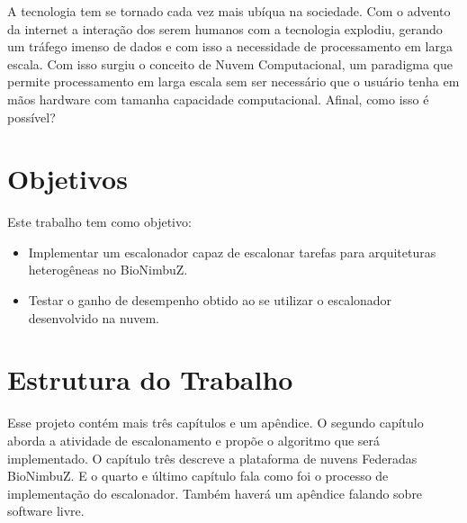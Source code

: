 A tecnologia tem se tornado cada vez mais ubíqua na sociedade. Com o advento da internet a interação dos serem humanos com a tecnologia explodiu, gerando um tráfego imenso de dados e com isso a necessidade de processamento em larga escala. Com isso surgiu o conceito de Nuvem Computacional, um paradigma que permite processamento em larga escala sem ser necessário que o usuário tenha em mãos hardware com tamanha capacidade computacional. Afinal, como isso é possível?




\section{Objetivos}
Este trabalho tem como objetivo:
\begin{itemize}
	\item Implementar um escalonador capaz de escalonar tarefas para arquiteturas heterogêneas no BioNimbuZ.
	\item Testar o ganho de desempenho obtido ao se utilizar o escalonador desenvolvido na nuvem.
\end{itemize}

\section{Estrutura do Trabalho}
Esse projeto contém mais três capítulos e um apêndice. O segundo capítulo aborda a atividade de escalonamento e propõe o algoritmo que será implementado. O capítulo três descreve a plataforma de nuvens Federadas BioNimbuZ. E o quarto e último capítulo fala como foi o processo de implementação do escalonador. Também haverá um apêndice falando sobre software livre.
